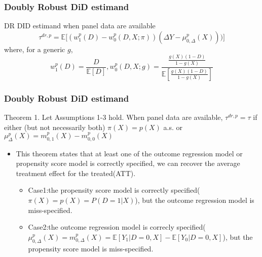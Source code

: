 \documentclass{beamer}
\begin{document}
\begin{frame}\frametitle{Doubly Robust DiD estimand}
    \begin{block}{DR DID estimand when panel data are available}
        \begin{equation*}
        \tau^{dr,p} = \mathbb{E}\lbrack (w^{p}_{1}(D)- w^{p}_{0}(D,X;\pi))(\Delta Y - \mu ^{p}_{0,\Delta}(X)))\rbrack
        \end{equation*}
        where, for a generic $g$,
        \begin{equation*}
            w^{p}_{1}(D) = \frac{D}{ \mathbb{E}[D]},w^{p}_{0}(D,X;g) = \frac{ \frac{g(X)(1-D)}{1-g(X)}}{ \mathbb{E}[\frac{g(X)(1-D)}{1-g(X)}]}
        \end{equation*}
    \end{block}
\end{frame}

\begin{frame}\frametitle{Doubly Robust DiD estimand}
    \begin{block}{Theorem 1.}
        Let Assumptions 1-3 hold. When panel data are available, $\tau ^{dr,p} = \tau$ if either (but not necessarily both) $\pi(X) = p(X)$ a.s. or $\mu ^{p}_{\Delta}(X) = m^{p}_{0,1}(X) - m^{p}_{0,0}(X)$
    \end{block}

    \begin{itemize}
        \item This theorem states that at least one of the outcome regression model or propensity score model is correctly specified, we can recover the average treatment effect for the treated(ATT).
        \begin{itemize}
            \item Case1:the propensity score model is correctly specified($\pi(X) = p(X) = P(D = 1|X)$), but the outcome regression model is miss-specified.
            \item Case2:the outcome regression model is correcly specified($\mu ^{p}_{0,\Delta}(X) = m^{p}_{0,\Delta}(X) = \mathbb{E}[Y_{1}|D = 0, X] - \mathbb{E}[Y_{0}|D = 0, X]$), but the propensity score model is miss-specified.
        \end{itemize}
    \end{itemize}
\end{frame}
\end{document}
